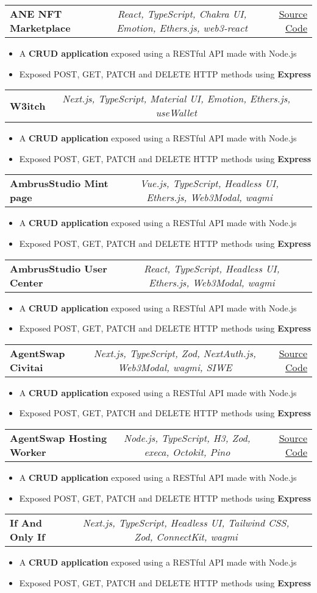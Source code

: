 \documentclass[a4paper,11pt]{article}
\makeatletter
\newcommand{\resumeItem}[1]{
  \item\small{#1}
}
\newcommand{\resumeItemListStart}{\begin{itemize}[rightmargin=0.11in]}
\newcommand{\resumeItemListEnd}{\end{itemize}}
\newcommand{\resumeTrioHeading}[3]{
  \item\small{
    \begin{tabular*}{0.96\textwidth}[t]{
      l@{\extracolsep{\fill}}c@{\extracolsep{\fill}}r
    }
      \textbf{#1} & \textit{#2} & #3
    \end{tabular*}
  }
}
\makeatother
\begin{document}
  \resumeTrioHeading{ANE NFT Marketplace}{React, TypeScript, Chakra UI, Emotion, Ethers.js, web3-react}{\href{https://github.com/Artnomics-org/art-and-economics}{\uline{Source Code}}}
  \resumeItemListStart{}
    \resumeItem{A \textbf{CRUD application} exposed using a RESTful API made with Node.js}
    \resumeItem{Exposed POST, GET, PATCH and DELETE HTTP methods using \textbf{Express}}
  \resumeItemListEnd{}

  \resumeTrioHeading{W3itch}{Next.js, TypeScript, Material UI, Emotion, Ethers.js, useWallet}{}
  \resumeItemListStart{}
    \resumeItem{A \textbf{CRUD application} exposed using a RESTful API made with Node.js}
    \resumeItem{Exposed POST, GET, PATCH and DELETE HTTP methods using \textbf{Express}}
  \resumeItemListEnd{}

  \resumeTrioHeading{AmbrusStudio Mint page}{Vue.js, TypeScript, Headless UI, Ethers.js, Web3Modal, wagmi}{}
  \resumeItemListStart{}
    \resumeItem{A \textbf{CRUD application} exposed using a RESTful API made with Node.js}
    \resumeItem{Exposed POST, GET, PATCH and DELETE HTTP methods using \textbf{Express}}
  \resumeItemListEnd{}

  \resumeTrioHeading{AmbrusStudio User Center}{React, TypeScript, Headless UI, Ethers.js, Web3Modal, wagmi}{}
  \resumeItemListStart{}
    \resumeItem{A \textbf{CRUD application} exposed using a RESTful API made with Node.js}
    \resumeItem{Exposed POST, GET, PATCH and DELETE HTTP methods using \textbf{Express}}
  \resumeItemListEnd{}

  \resumeTrioHeading{AgentSwap Civitai}{Next.js, TypeScript, Zod, NextAuth.js, Web3Modal, wagmi, SIWE}{\href{https://github.com/agentswap/civitai}{\uline{Source Code}}}
  \resumeItemListStart{}
    \resumeItem{A \textbf{CRUD application} exposed using a RESTful API made with Node.js}
    \resumeItem{Exposed POST, GET, PATCH and DELETE HTTP methods using \textbf{Express}}
  \resumeItemListEnd{}

  \resumeTrioHeading{AgentSwap Hosting Worker}{Node.js, TypeScript, H3, Zod, execa, Octokit, Pino}{\href{https://github.com/agentswap/hosting-worker}{\uline{Source Code}}}
  \resumeItemListStart{}
    \resumeItem{A \textbf{CRUD application} exposed using a RESTful API made with Node.js}
    \resumeItem{Exposed POST, GET, PATCH and DELETE HTTP methods using \textbf{Express}}
  \resumeItemListEnd{}

  \resumeTrioHeading{If And Only If}{Next.js, TypeScript, Headless UI, Tailwind CSS, Zod, ConnectKit, wagmi}{}
  \resumeItemListStart{}
    \resumeItem{A \textbf{CRUD application} exposed using a RESTful API made with Node.js}
    \resumeItem{Exposed POST, GET, PATCH and DELETE HTTP methods using \textbf{Express}}
  \resumeItemListEnd{}
\end{document}
